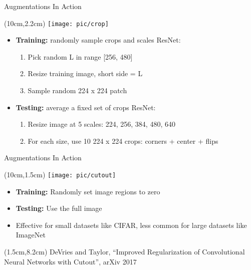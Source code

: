 \documentclass[serif, aspectratio=169]{beamer}
\begin{document}
\begin{frame}{Augmentations In Action}
	\begin{textblock*}{5cm}(10cm,2.2cm) %
		\texttt{[image: pic/crop]}
	\end{textblock*}

	\begin{itemize}
	\item \textbf{Training:} randomly sample crops and scales \newline ResNet:
		\begin{enumerate}
				\item Pick random L in range [256, 480]
				\item Resize training image, short side = L
				\item Sample random 224 x 224 patch
		\end{enumerate}
		
	\item \textbf{Testing:} average a fixed set of crops \newline ResNet:
		\begin{enumerate}
			\item Resize image at 5 scales: {224, 256, 384, 480, 640}
			\item For each size, use 10 224 x 224 crops:  corners + center + flips
		\end{enumerate}				
	\end{itemize}
\end{frame}


\begin{frame}{Augmentations In Action}
	\begin{textblock*}{5cm}(10cm,1.5cm) %
		\texttt{[image: pic/cutout]}
	\end{textblock*}

	\begin{itemize}
		\item \textbf{Training:} Randomly set image regions to zero
		\item \textbf{Testing:} Use the full image
		\item Effective for  small datasets like CIFAR, less \newline common for large datasets like ImageNet
	\end{itemize}

	\begin{textblock*}{10cm}(1.5cm,8.2cm) %
		\tiny{DeVries and Taylor, ``Improved Regularization of Convolutional
		Neural Networks with Cutout'', arXiv 2017}
	\end{textblock*}
\end{frame}
\end{document}
